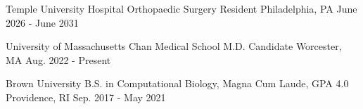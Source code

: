 
\vspace{-2mm}
\begin{cventries}

  \cventry
  {Temple University Hospital} %
  {Orthopaedic Surgery Resident} %
  {Philadelphia, PA} %
  {June 2026 - June 2031} %
  {}

  \cventry
  {University of Massachusetts Chan Medical School} %
  {M.D. Candidate} %
  {Worcester, MA} %
  {Aug. 2022 - Present} %
  {}

  \cventry
  {Brown University} %
  {B.S. in Computational Biology, Magna Cum Laude, GPA 4.0} %
  {Providence, RI} %
  {Sep. 2017 - May 2021} %
  {}
\end{cventries}
